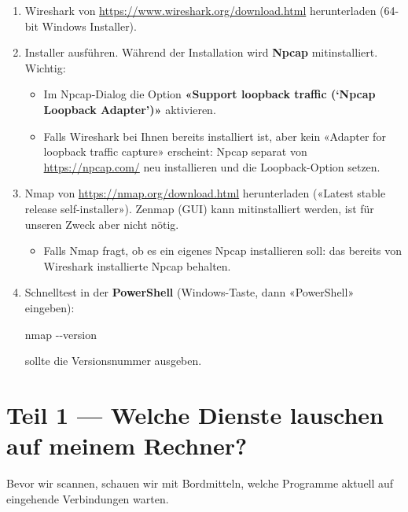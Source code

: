 \documentclass[
  nswissgerman,
  a4paper,
  DIV=11,
  numbers=noendperiod,
  ngerman]{scrreprt}
\newenvironment{Shaded}{\begin{snugshade}}{\end{snugshade}}
\newcommand{\NormalTok}[1]{\textcolor[rgb]{0.00,0.23,0.31}{#1}}
\newcommand{\OperatorTok}[1]{\textcolor[rgb]{0.37,0.37,0.37}{#1}}
\providecommand{\tightlist}{%
  \setlength{\itemsep}{0pt}\setlength{\parskip}{0pt}}
\begin{document}
\begin{enumerate}
\def\labelenumi{\arabic{enumi}.}
\item
  Wireshark von \url{https://www.wireshark.org/download.html}
  herunterladen (64-bit Windows Installer).
\item
  Installer ausführen. Während der Installation wird \textbf{Npcap}
  mitinstalliert. Wichtig:

  \begin{itemize}
  \tightlist
  \item
    Im Npcap-Dialog die Option \textbf{«Support loopback traffic (`Npcap
    Loopback Adapter')»} aktivieren.
  \item
    Falls Wireshark bei Ihnen bereits installiert ist, aber kein
    «Adapter for loopback traffic capture» erscheint: Npcap separat von
    \url{https://npcap.com/} neu installieren und die Loopback-Option
    setzen.
  \end{itemize}
\item
  Nmap von \url{https://nmap.org/download.html} herunterladen («Latest
  stable release self-installer»). Zenmap (GUI) kann mitinstalliert
  werden, ist für unseren Zweck aber nicht nötig.

  \begin{itemize}
  \tightlist
  \item
    Falls Nmap fragt, ob es ein eigenes Npcap installieren soll: das
    bereits von Wireshark installierte Npcap behalten.
  \end{itemize}
\item
  Schnelltest in der \textbf{PowerShell} (Windows-Taste, dann
  «PowerShell» eingeben):

\begin{Shaded}
\begin{Highlighting}[numbers=left,,]
\NormalTok{nmap }\OperatorTok{{-}{-}}\NormalTok{version}
\end{Highlighting}
\end{Shaded}

  sollte die Versionsnummer ausgeben.
\end{enumerate}

\section{Teil 1 --- Welche Dienste lauschen auf meinem
Rechner?}\label{teil-1-welche-dienste-lauschen-auf-meinem-rechner}

Bevor wir scannen, schauen wir mit Bordmitteln, welche Programme aktuell
auf eingehende Verbindungen warten.
\end{document}
